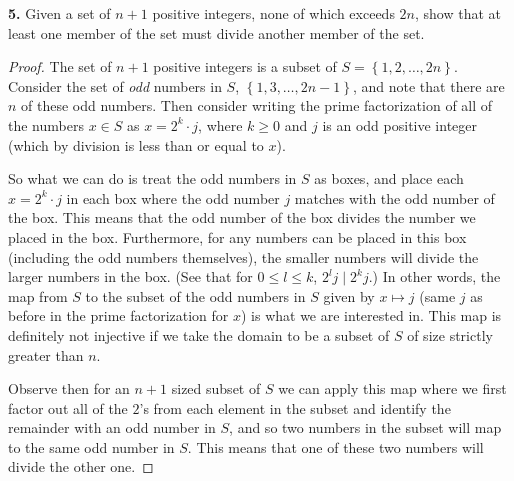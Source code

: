 \documentclass[11pt]{article}
\newcommand{\cbr}[1]{\left\{#1\right\}}
\begin{document}
\textbf{5.} Given a set of $n+1$ positive integers, none of which exceeds $2n$, show that at least one member of the set must divide another member of the set. \begin{proof}
    The set of $n+1$ positive integers is a subset of $S = \cbr{1,2,\dots,2n}$. Consider the set of \textit{odd} numbers in $S$, $\cbr{1,3,\dots,2n-1}$, and note that there are $n$ of these odd numbers. Then consider writing the prime factorization of all of the numbers $x\in S$ as $x = 2^k\cdot j$, where $k\geq 0$ and $j$ is an odd positive integer (which by division is less than or equal to $x$).
    
    So what we can do is treat the odd numbers in $S$ as boxes, and place each $x = 2^k\cdot j$ in each box where the odd number $j$ matches with the odd number of the box. This means that the odd number of the box divides the number we placed in the box. Furthermore, for any numbers can be placed in this box (including the odd numbers themselves), the smaller numbers will divide the larger numbers in the box. (See that for $0 \leq l \leq k$, $2^lj\mid 2^kj$.) In other words, the map from $S$ to the subset of the odd numbers in $S$ given by $x\mapsto j$ (same $j$ as before in the prime factorization for $x$) is what we are interested in. This map is definitely not injective if we take the domain to be a subset of $S$ of size strictly greater than $n$.

    Observe then for an $n+1$ sized subset of $S$ we can apply this map where we first factor out all of the $2$'s from each element in the subset and identify the remainder with an odd number in $S$, and so two numbers in the subset will map to the same odd number in $S$. This means that one of these two numbers will divide the other one.
\end{proof}
\end{document}
